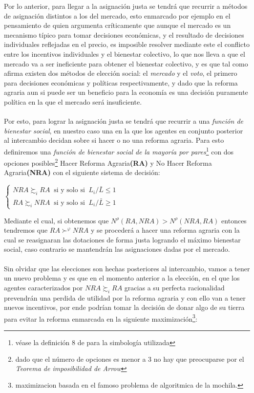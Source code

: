 \documentclass[11pt]{article}
\begin{document}
{\begin{flushleft}
    Por lo anterior, para llegar a la asignación justa se tendrá que recurrir a métodos de asignación distintos a los del mercado, esto enmarcado 
    por ejemplo en el pensamiento de \citet{arrow_1973} quien argumenta críticamente que aunque el mercado es un mecanismo típico para tomar decisiones económicas, 
    y el resultado de decisiones individuales reflejadas en el precio, es imposible resolver mediante este el conflicto entre los incentivos individuales y el bienestar colectivo,
    lo que nos lleva a que el mercado va a ser ineficiente para obtener el bienestar colectivo, y es que tal como afirma \citet{arrow_1951} existen dos métodos de elección social: 
    el \textit{mercado} y el \textit{voto}, el primero para decisiones económicas y políticas respectivamente, y dado que la reforma agraria aun si puede ser un beneficio para la 
    economía es una decisión puramente política en la que el mercado será insuficiente.
    \\~\\
    Por esto, para lograr la asignación justa se tendrá que recurrir a una \textit{función de bienestar social}, en nuestro caso una
    en la que los agentes en conjunto posterior al intercambio decidan sobre si hacer o no una reforma agraria. Para esto definiremos una
    \textit{función de bienestar social de la mayoría por pares}\footnote{véase la definición 8 de \citet{Lozano2022} para la simbología utilizada} con dos opciones posibles\footnote{dado que el número de opciones es menor a 3 no hay que preocuparse por el \textit{Teorema de imposibilidad de Arrow}}
    Hacer Reforma Agraria\textbf{(RA)} y No Hacer Reforma Agraria\textbf{(NRA)} con el siguiente sistema de decisión:

    \begin{center}

        $ 
     \begin{cases}
         NRA \succsim_i RA ~ \text{ si y solo si } ~  L_i/\bar{L} \le 1\\
         RA \succsim_i NRA ~ \text{ si y solo si } ~  L_i/\bar{L} \ge 1
     \end{cases}
         $
     \end{center}

     Mediante el cual, si obtenemos que $N^\rho(RA,NRA)>N^\rho(NRA,RA)$ entonces tendremos que $RA \succ^\varphi NRA$ y se procederá a hacer una reforma agraria
     con la cual se reasignaran las dotaciones de forma justa logrando el máximo bienestar social, caso contrario se mantendrán las asignaciones dadas por el mercado.
     \\~\\
     Sin olvidar que las elecciones son hechas posteriores al intercambio, vamos a tener un nuevo problema y es que en el momento anterior a la elección, en el que 
     los agentes caracterizados por $NRA \succsim_i RA$ gracias a su perfecta racionalidad prevendrán una perdida de utilidad por la reforma agraria y con ello van
     a tener nuevos incentivos, por ende podrían tomar la decisión de donar algo de su tierra para evitar la reforma enmarcada en la siguiente maximización\footnote{maximizacion basada en el famoso problema de algoritmica de la mochila.}:
     

\end{flushleft}}
\end{document}
